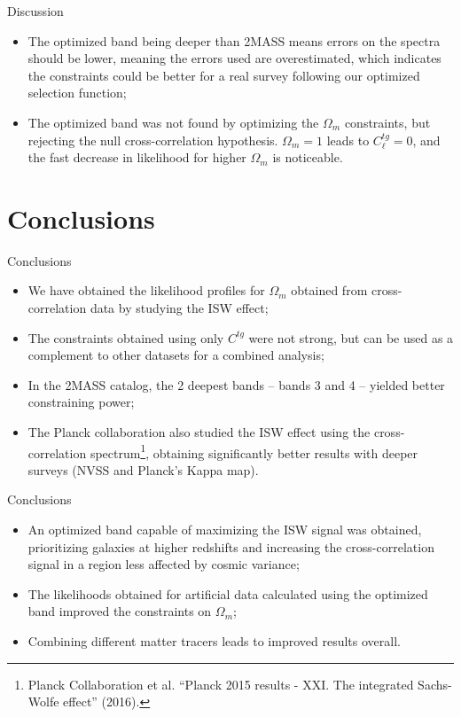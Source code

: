 \documentclass[serif, aspectratio=169]{beamer}
\begin{document}
\begin{frame}{Discussion}
    \begin{itemize}
        \item The optimized band being deeper than 2MASS means errors on the spectra should be lower, meaning the errors used are overestimated, which indicates the constraints could be better for a real survey following our optimized selection function;
        \item The optimized band was not found by optimizing the $\Omega_m$ constraints, but rejecting the null cross-correlation hypothesis. $\Omega_m=1$ leads to $C_\ell^{tg}=0$, and the fast decrease in likelihood for higher $\Omega_m$ is noticeable.
    \end{itemize}
\end{frame}

\section{Conclusions}

\begin{frame}{Conclusions}
    \begin{itemize}
        \item We have obtained the likelihood profiles for $\Omega_m$ obtained from cross-correlation data by studying the ISW effect;
        \item The constraints obtained using only $C^{tg}$ were not strong, but can be used as a complement to other datasets for a combined analysis;
        \item In the 2MASS catalog, the 2 deepest bands -- bands 3 and 4 -- yielded better constraining power;
        \item The Planck collaboration also studied the ISW effect using the cross-correlation spectrum\footnote{Planck Collaboration et al. “Planck 2015 results - XXI. The integrated Sachs-Wolfe effect” (2016).}, obtaining significantly better results with deeper surveys (NVSS and Planck's Kappa map).
    \end{itemize}
\end{frame}
\begin{frame}{Conclusions}
    \begin{itemize}
        \item An optimized band capable of maximizing the ISW signal was obtained, prioritizing galaxies at higher redshifts and increasing the cross-correlation signal in a region less affected by cosmic variance;
        \item The likelihoods obtained for artificial data calculated using the optimized band improved the constraints on $\Omega_m$;
        \item Combining different matter tracers leads to improved results overall.
    \end{itemize}
\end{frame}
\end{document}
